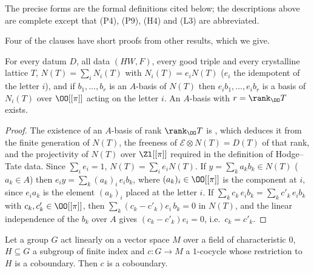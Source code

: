 The precise forms are the formal definitions cited below; the descriptions above are complete except that (P4), (P9), (H4) and (L3) are
abbreviated.

Four of the clauses have short proofs from other results, which we give.

\begin{proposition}[Clause (P1)]\label{pf:sh-hodge:P1}
For every datum $D$, all data $(HW,F)$, every good triple and every crystalline lattice $T$, $N(T)=\sum_iN_i(T)$ with $N_i(T)=e_iN(T)$ ($e_i$ the idempotent of the
letter $i$), and if $b_1,\dots,b_r$ is an $A$-basis of $N(T)$ then $e_ib_1,\dots,e_ib_r$ is a basis of $N_i(T)$ over $\OO[[\pi]]$ acting on the letter $i$. An
$A$-basis with $r=\rank_\OO T$ exists.
\end{proposition}

\begin{proof}
The existence of an $A$-basis of rank $\rank_\OO T$ is , which deduces it from the finite generation of $N(T)$, the
freeness of $\mathcal E\otimes N(T)=D(T)$ of that rank, and the projectivity of $N(T)$ over $\Zl[[\pi]]$ required in the definition of Hodge--Tate data. Since
$\sum_ie_i=1$, $N(T)=\sum_ie_iN(T)$. If $y=\sum_ka_kb_k\in N(T)$ ($a_k\in A$) then $e_iy=\sum_k(a_k)_i\,e_ib_k$, where $(a_k)_i\in\OO[[\pi]]$ is the component at
$i$, since $e_ia_k$ is the element $(a_k)_i$ placed at the letter $i$. If $\sum_kc_k\,e_ib_k=\sum_kc'_k\,e_ib_k$ with $c_k,c'_k\in\OO[[\pi]]$, then
$\sum_k(c_k-c'_k)e_i\,b_k=0$ in $N(T)$, and the linear independence of the $b_k$ over $A$ gives $(c_k-c'_k)e_i=0$, i.e.\ $c_k=c'_k$.
\end{proof}

\begin{lemma}\label{pf:sh-hodge:finind}
Let a group $G$ act linearly on a vector space $M$ over a field of characteristic $0$, $H\subseteq G$ a subgroup of finite index and $c\colon G\to M$ a
$1$-cocycle whose restriction to $H$ is a coboundary. Then $c$ is a coboundary.
\end{lemma}

